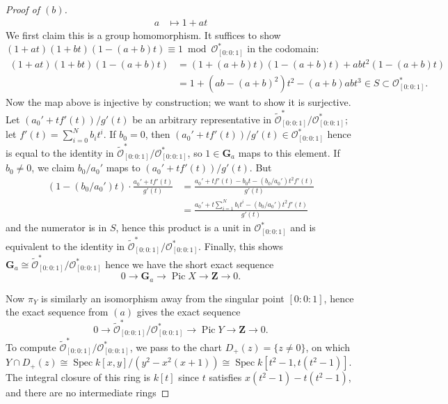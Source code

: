\documentclass[10pt]{article}
\theoremstyle{definition}
\theoremstyle{remark}
\numberwithin{equation}{section}
\numberwithin{figure}{subsubsection}
\DeclareMathOperator{\Spec}{Spec}
\DeclareMathOperator{\Pic}{Pic}
\newcommand{\OO}{\mathcal{O}}
\begin{document}
\begin{proof}[Proof of $(b)$]
\begin{align*}
    a &\longmapsto 1+at
  \end{align*}
  We first claim this is a group homomorphism. It suffices to show
  $(1+at)(1+bt)(1-(a+b)t) \equiv 1 \bmod \OO_{[0:0:1]}^*$ in the codomain:
  \begin{align*}
    (1+at)(1+bt)(1-(a+b)t) &= (1+(a+b)t)(1-(a+b)t) + abt^2(1-(a+b)t)\\
    &= 1 + (ab - (a+b)^2)t^2 - (a+b)abt^3 \in S \subset \OO_{[0:0:1]}^*.
  \end{align*}
  Now the map above is injective by construction; we want to show it is
  surjective. Let $(a_0' + tf'(t))/g'(t)$ be an arbitrary
  representative in $\tilde{\OO}_{[0:0:1]}^*/\OO_{[0:0:1]}^*$; let $f'(t) =
  \sum_{i=0}^N b_it^i$. If $b_0 = 0$, then $(a_0' + tf'(t))/g'(t) \in
  \OO_{[0:0:1]}^*$ hence is equal to the identity in
  $\tilde{\OO}_{[0:0:1]}^*/\OO_{[0:0:1]}^*$, so $1 \in \mathbf{G}_a$ maps to
  this element. If $b_0 \ne 0$, we claim $b_0/a_0'$ maps to $(a_0' +
  tf'(t))/g'(t)$. But
  \begin{align*}
    (1 - (b_0/a_0')t) \cdot \frac{a_0' + tf'(t)}{g'(t)} &=
    \frac{a_0' + tf'(t) - b_0t - (b_0/a_0')t^2f'(t)}{g'(t)}\\
    &= \frac{a_0' + t\sum_{i=1}^N b_it^i - (b_0/a_0')t^2f'(t)}{g'(t)}
  \end{align*}
  and the numerator is in $S$, hence this product is a unit in
  $\OO_{[0:0:1]}^*$ and is equivalent to the identity in
  $\tilde{\OO}_{[0:0:1]}^*/\OO_{[0:0:1]}^*$. Finally, this shows
  $\mathbf{G}_a \cong \tilde{\OO}_{[0:0:1]}^*/\OO_{[0:0:1]}^*$ hence we have the
  short exact sequence
  \begin{equation*}
    0 \longrightarrow \mathbf{G}_a \longrightarrow \Pic X \longrightarrow
    \mathbf{Z} \longrightarrow 0.
  \end{equation*}
  \par Now $\pi_Y$ is similarly an isomorphism away from the singular point $[0
  : 0 : 1]$, hence the exact sequence from $(a)$ gives the exact sequence
  \begin{equation*}
    0 \longrightarrow \tilde{\OO}_{[0:0:1]}^*/\OO_{[0:0:1]}^* \longrightarrow \Pic Y
    \longrightarrow \mathbf{Z} \longrightarrow 0.
  \end{equation*}
  To compute $\tilde{\OO}_{[0:0:1]}^*/\OO_{[0:0:1]}^*$, we pass to the chart $D_+(z)
  = \{z \ne 0\}$, on which $Y \cap D_+(z) \cong \Spec k[x,y]/(y^2 - x^2(x+1))
  \cong \Spec k[t^2-1,t(t^2-1)]$. The integral closure of this ring is $k[t]$
  since $t$ satisfies $x(t^2-1) - t(t^2-1)$, and there are no intermediate rings

\end{proof}
\end{document}
